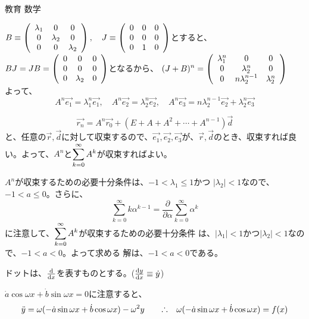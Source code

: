 \documentclass[fleqn]{jbook}
\begin{document}
\begin{answer}{教育 数学}{}
\begin{subanswers}
\begin{subsubanswers}
\SubSubAnswer
$\displaystyle{B\equiv\left(\begin{array}{ccc}
\lambda_1 & 0 & 0 \\
0 & \lambda_2 & 0 \\
0 & 0  & \lambda_2 
\end{array}\right),\quad J\equiv\left(\begin{array}{ccc}
0 & 0 & 0 \\
0 & 0 & 0 \\
0 & 1 & 0 
\end{array}\right) }$とすると、\\
$\displaystyle{BJ=JB=\left( \begin{array}{ccc}
0 & 0 & 0 \\
0 & 0 & 0 \\
0 & \lambda_2 & 0 
\end{array}\right) }$となるから、
$\displaystyle{(J+B)^n=\left( \begin{array}{ccc}
\lambda_1^n & 0 & 0 \\
0 & \lambda_2^n & 0 \\
0 & n\lambda_2^{n-1} & \lambda_2^n 
\end{array}\right) }$ \\
よって、
\[ A^n\vec{e_1}=\lambda_1^n\vec{e_1},\quad A^n\vec{e_2}=\lambda_2^n\vec{e_2},\quad A^n\vec{e_3}=n\lambda_2^{n-1}\vec{e_2}+\lambda_2^n \vec{e_3} \]

\SubSubAnswer
\[ \vec{r_n}=A^n \vec{r_0}+(E+A+A^2+\cdots+A^{n-1})\vec{d} \]
と、任意の$\vec{r},\vec{d}$に対して収束するので、$\vec{e_1},\vec{e_2},\vec{e_3}$が、$\vec{r},\vec{d}$のとき、収束すれば良い。よって、$A^n$と$\displaystyle{\sum_{k=0}^{\infty}A^k}$が収束すればよい。

$A^n$が収束するための必要十分条件は、$-1 <\lambda_1  \leq 1$かつ
$|\lambda_2| < 1$なので、$-1 < a \leq 0 $。さらに、
\[\sum_{k=0}^{\infty}k\alpha^{k-1}=\frac{\partial}{\partial \alpha}\sum_{k=0}^{\infty}\alpha^k\]
に注意して、$\displaystyle{\sum_{k=0}^{\infty}A^k}$が収束するための必要十分条件
は、$|\lambda_1 |< 1$かつ$|\lambda_2| <1$なので、$-1<a<0$。よって求める
解は、$-1<a<0$である。

\end{subsubanswers}

\SubAnswer
ドットは、${\frac{{\rm d} }{{\rm d} x}}$を表すものとする。(${\frac{{\rm d} y}{{\rm d} x}} \equiv \dot{y}$)
\begin{subsubanswers}
\SubSubAnswer
$\dot{a}\cos\omega x+\dot{b}\sin\omega x=0$に注意すると、
\[
\ddot{y} = \omega(-\dot{a}\sin\omega x+\dot{b}\cos\omega
x)-\omega^2y 
\qquad 
\Yueni \omega(-\dot a \sin\omega x + \dot b \cos\omega x)=f(x) 
\]


\end{subsubanswers}
\end{subanswers}
\end{answer}
\end{document}
